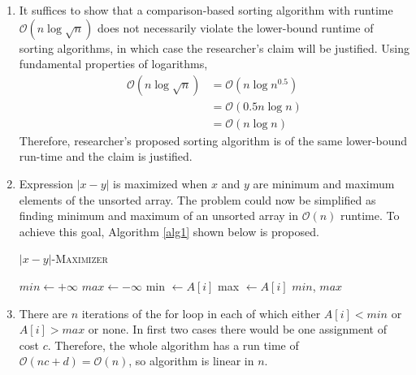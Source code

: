 \begin{enumerate}[label=(\alph*)]
\item It suffices to show that a comparison-based sorting algorithm with runtime $\mathcal{O}(n\log \sqrt{n})$ does not necessarily violate the lower-bound runtime of sorting algorithms, in which case the researcher's claim will be justified.
Using fundamental properties of logarithms,
\begin{equation}\label{eq31}
\begin{aligned}
\mathcal{O}(n\log \sqrt{n}) &= \mathcal{O}(n\log n^{0.5})\\
&= \mathcal{O}(0.5 n \log n)\\
&= \mathcal{O}(n\log n)
\end{aligned}
\end{equation}
Therefore, researcher's proposed sorting algorithm is of the same lower-bound run-time and the claim is justified.
\item Expression $|x-y|$ is maximized when $x$ and $y$ are minimum and maximum elements of the unsorted array.
The problem could now be simplified as finding minimum and maximum of an unsorted array in $\mathcal{O}(n)$ runtime.
To achieve this goal, Algorithm \ref{alg1} shown below is proposed.
\begin{algorithm}[H]
\caption{\textsc{$|x-y|$-Maximizer}}\label{alg1}
\begin{algorithmic}[1]
\State $min \leftarrow +\infty$
\State $max \leftarrow -\infty$
\State min $\leftarrow A[i]$
\State max $\leftarrow A[i]$
\EndIf
\EndFor
\State \Return $min$, $max$
\end{algorithmic}
\end{algorithm}
\item There are $n$ iterations of the for loop in each of which either $A[i] < min$ or $A[i] > max$ or none.
In first two cases there would be one assignment of cost $c$.
Therefore, the whole algorithm has a run time of $\mathcal{O}(nc+d)=\mathcal{O}(n)$, so algorithm is linear in $n$.
\end{enumerate}
